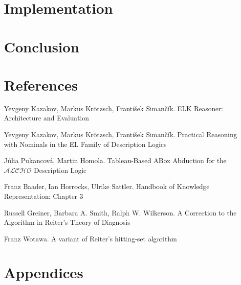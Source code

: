 \documentclass[12pt,a4paper]{article}
\begin{document}
\section{Implementation}

\pagebreak
\section*{Conclusion}


\pagebreak
\section*{References}

\begin{enumerate}[{[1]}]

\item Yevgeny Kazakov, Markus Krötzsch, František Simančík. ELK Reasoner: Architecture and Evaluation

\item Yevgeny Kazakov, Markus Krötzsch, František Simančík. Practical Reasoning with Nominals in the EL Family of Description Logics

\item Júlia Pukancová, Martin Homola. Tableau-Based ABox Abduction for the $\mathcal{ALCHO}$ Description Logic

\item Franz Baader, Ian Horrocks, Ulrike Sattler. Handbook of Knowledge Representation: Chapter 3

\item Russell Greiner, Barbara A. Smith, Ralph W. Wilkerson. A Correction to the Algorithm in Reiter's Theory of Diagnosis

\item Franz Wotawa. A variant of Reiter’s hitting-set algorithm

\end{enumerate}

\pagebreak
\section*{Appendices}
\end{document}
